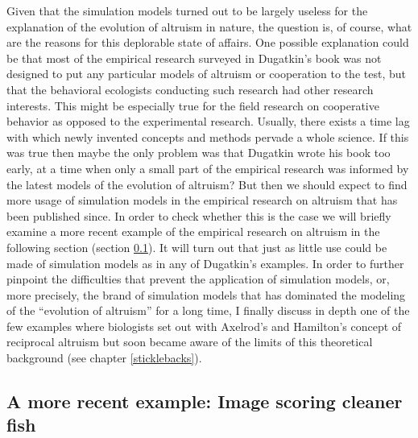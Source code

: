 Given that the simulation models turned out to be largely useless for the
explanation of the evolution of altruism in nature, the question is, of course,
what are the reasons for this deplorable state of affairs. One possible
explanation could be that most of the empirical research surveyed in
Dugatkin's book was not designed to put any particular models of altruism or
cooperation to the test, but that the behavioral ecologists conducting such
research had other research interests. This might be especially true
for the field research on cooperative behavior as opposed to the
experimental research. Usually, there exists a time lag with which newly
invented concepts and methods pervade a whole science. If this was
true then maybe the only problem was that Dugatkin wrote his book too early,
at a time when only a small part of the empirical research was informed by the
latest models of the evolution of altruism? But then we should expect to find
more usage of simulation models in the empirical research on altruism that has
been published since. In order to check whether this is the case we will
briefly examine a more recent example of the empirical research on altruism in
the following section (section \ref{recentResearch}). It will turn out that
just as little use could be made of simulation models as in any of Dugatkin's
examples. In order to further pinpoint the difficulties that prevent the
application of simulation models, or, more precisely, the brand of simulation
models that has dominated the modeling of the ``evolution of altruism'' for a
long time, I finally discuss in depth one of the few examples where
biologists set out with Axelrod's and Hamilton's concept of reciprocal
altruism but soon became aware of the limits of this theoretical background
(see chapter \ref{sticklebacks}).

\subsection{A more recent example: Image scoring cleaner fish}
\label{recentResearch}

